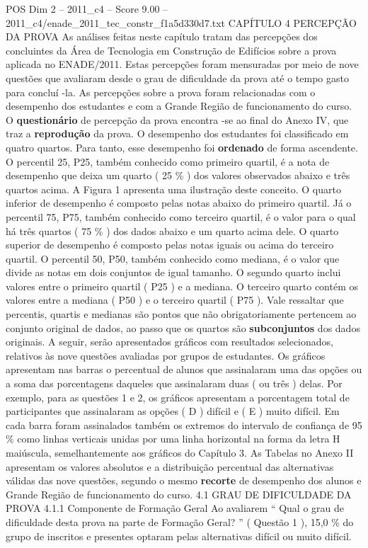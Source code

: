 \begin{textsample}{POS Dim 2 – 2011\_c4 – Score 9.00 – 2011\_c4/enade\_2011\_tec\_constr\_f1a5d330d7.txt}  \label{ex:f2_pos_128}
CAPÍTULO 4 PERCEPÇÃO DA PROVA As análises feitas neste capítulo tratam das percepções dos concluintes da Área de Tecnologia em Construção de Edifícios sobre a prova aplicada no ENADE/2011.
Estas percepções foram mensuradas por meio de nove questões que avaliaram desde o grau de dificuldade da prova até o tempo gasto para concluí -la.
As percepções sobre a prova foram relacionadas com o desempenho dos estudantes e com a Grande Região de funcionamento do curso.
O \textbf{questionário} de percepção da prova encontra -se ao final do Anexo IV, que traz a \textbf{reprodução} da prova.
O desempenho dos estudantes foi classificado em quatro quartos.
Para tanto, esse desempenho foi \textbf{ordenado} de forma ascendente.
O percentil 25, P25, também conhecido como primeiro quartil, é a nota de desempenho que deixa um quarto ( 25 \% ) dos valores observados abaixo e três quartos acima.
A Figura 1 apresenta uma ilustração deste conceito.
O quarto inferior de desempenho é composto pelas notas abaixo do primeiro quartil.
Já o percentil 75, P75, também conhecido como terceiro quartil, é o valor para o qual há três quartos ( 75 \% ) dos dados abaixo e um quarto acima dele.
O quarto superior de desempenho é composto pelas notas iguais ou acima do terceiro quartil.
O percentil 50, P50, também conhecido como mediana, é o valor que divide as notas em dois conjuntos de igual tamanho.
O segundo quarto inclui valores entre o primeiro quartil ( P25 ) e a mediana.
O terceiro quarto contém os valores entre a mediana ( P50 ) e o terceiro quartil ( P75 ).
Vale ressaltar que percentis, quartis e medianas são pontos que não obrigatoriamente pertencem ao conjunto original de dados, ao passo que os quartos são \textbf{subconjuntos} dos dados originais.
A seguir, serão apresentados gráficos com resultados selecionados, relativos às nove questões avaliadas por grupos de estudantes.
Os gráficos apresentam nas barras o percentual de alunos que assinalaram uma das opções ou a soma das porcentagens daqueles que assinalaram duas ( ou três ) delas.
Por exemplo, para as questões 1 e 2, os gráficos apresentam a porcentagem total de participantes que assinalaram as opções ( D ) difícil e ( E ) muito difícil.
Em cada barra foram assinalados também os extremos do intervalo de confiança de 95 \% como linhas verticais unidas por uma linha horizontal na forma da letra H maiúscula, semelhantemente aos gráficos do Capítulo 3.
As Tabelas no Anexo II apresentam os valores absolutos e a distribuição percentual das alternativas válidas das nove questões, segundo o mesmo \textbf{recorte} de desempenho dos alunos e Grande Região de funcionamento do curso. 4.1 GRAU DE DIFICULDADE DA PROVA 4.1.1 Componente de Formação Geral Ao avaliarem “ Qual o grau de dificuldade desta prova na parte de Formação Geral? ” ( Questão 1 ), 15,0 \% do grupo de inscritos e presentes optaram pelas alternativas difícil ou muito difícil.

\end{textsample}
